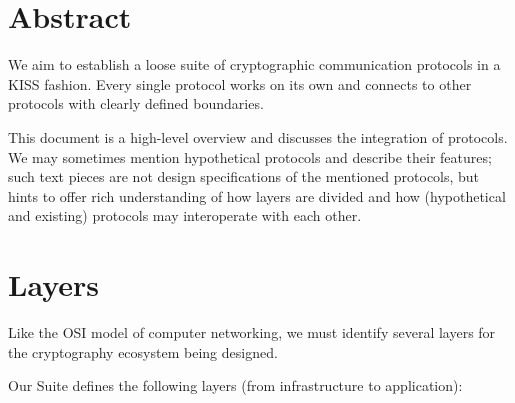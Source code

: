 \documentclass[a4paper,11pt]{article}
\begin{document}
\fulldoctitle


\section*{Abstract}

We aim to establish a loose suite of cryptographic communication protocols in a KISS fashion.
Every single protocol works on its own and connects to other protocols with clearly defined boundaries.

This document is a high-level overview and discusses the integration of protocols.
We may sometimes mention hypothetical protocols and describe their features;
such text pieces are not design specifications of the mentioned protocols,
but hints to offer rich understanding of how layers are divided and how
(hypothetical and existing) protocols may interoperate with each other.

\tableofcontents\clearpage




\section{Layers}

Like the OSI model of computer networking, we must identify several layers for the cryptography ecosystem being designed.

Our Suite defines the following layers (from infrastructure to application):
\end{document}
